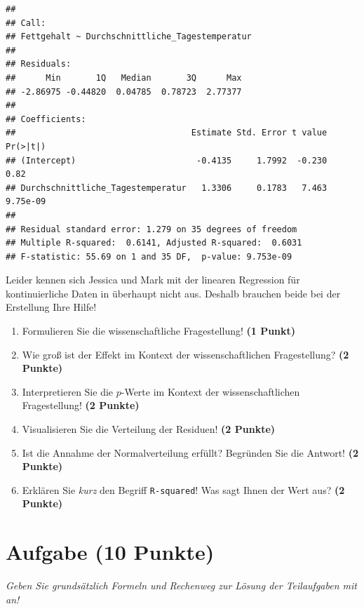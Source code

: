 \documentclass[a4paper, 9pt]{scrartcl}\usepackage[]{graphicx}\usepackage[]{xcolor}
\makeatletter
\newenvironment{kframe}{%
 \def\at@end@of@kframe{}%
 \ifinner\ifhmode%
  \def\at@end@of@kframe{\end{minipage}}%
  \begin{minipage}{\columnwidth}%
 \fi\fi%
 \def\FrameCommand##1{\hskip\@totalleftmargin \hskip-\fboxsep
 \colorbox{shadecolor}{##1}\hskip-\fboxsep
     \hskip-\linewidth \hskip-\@totalleftmargin \hskip\columnwidth}%
 \MakeFramed {\advance\hsize-\width
   \@totalleftmargin\z@ \linewidth\hsize
   \@setminipage}}%
 {\par\unskip\endMakeFramed%
 \at@end@of@kframe}
\newenvironment{knitrout}{}{} %
\makeatother
\begin{document}
\begin{knitrout}
\color{fgcolor}\begin{kframe}
\begin{verbatim}
## 
## Call:
## Fettgehalt ~ Durchschnittliche_Tagestemperatur
## 
## Residuals:
##      Min       1Q   Median       3Q      Max 
## -2.86975 -0.44820  0.04785  0.78723  2.77377 
## 
## Coefficients:
##                                   Estimate Std. Error t value Pr(>|t|)
## (Intercept)                        -0.4135     1.7992  -0.230     0.82
## Durchschnittliche_Tagestemperatur   1.3306     0.1783   7.463 9.75e-09
## 
## Residual standard error: 1.279 on 35 degrees of freedom
## Multiple R-squared:  0.6141,	Adjusted R-squared:  0.6031 
## F-statistic: 55.69 on 1 and 35 DF,  p-value: 9.753e-09
\end{verbatim}
\end{kframe}
\end{knitrout}

Leider kennen sich Jessica und Mark mit der linearen Regression für kontinuierliche Daten in \Rlogo überhaupt nicht aus. Deshalb brauchen beide bei der Erstellung Ihre Hilfe!


\begin{enumerate}
\item Formulieren Sie die wissenschaftliche Fragestellung! \textbf{(1 Punkt)}
\item Wie groß ist der Effekt im Kontext der wissenschaftlichen Fragestellung? \textbf{(2 Punkte)} 
\item Interpretieren Sie die $p$-Werte im Kontext der wissenschaftlichen Fragestellung! \textbf{(2 Punkte)}
\item Visualisieren Sie die Verteilung der Residuen! \textbf{(2 Punkte)} 
\item Ist die Annahme der Normalverteilung erfüllt? Begründen Sie die Antwort! \textbf{(2 Punkte)}
\item Erklären Sie \textit{kurz} den Begriff \texttt{R-squared}! Was sagt Ihnen der Wert aus? \textbf{(2 Punkte)}
\end{enumerate}
 
\clearpage

\section{Aufgabe \hfill (10 Punkte)}

\textit{Geben Sie grundsätzlich Formeln und Rechenweg zur Lösung der Teilaufgaben mit an!} \\[1Ex]
 
\end{document}
